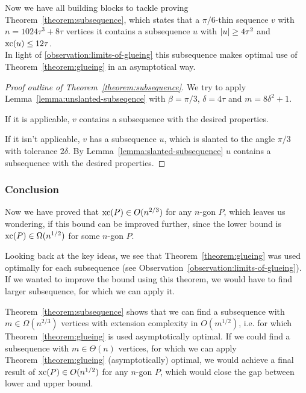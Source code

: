 Now we have all building blocks to tackle proving Theorem~\ref{theorem:subsequence}, which states that a $\pi/6$-thin sequence $v$ with $n = 1024\tau^3 + 8\tau$ vertices it contains a subsequence $u$ with $\lvert u\rvert \geq 4\tau^2$ and $\operatorname{xc}(u) \leq 12\tau$.\\
In light of \ref{observation:limits-of-glueing} this subsequence makes optimal use of Theorem~\ref{theorem:glueing} in an asymptotical way.

\begin{proof}[Proof outline of Theorem~\ref{theorem:subsequence}]
  We try to apply Lemma~\ref{lemma:unslanted-subseqence} with $\beta = \pi/3$, $\delta = 4\tau$ and $m = 8\delta^2 + 1$.

  If it is applicable, $v$ contains a subsequence with the desired properties.

  If it isn't applicable, $v$ has a subsequence $u$, which is slanted to the angle $\pi/3$ with tolerance $2\delta$. By Lemma~\ref{lemma:slanted-subsequence} $u$ contains a subsequence with the desired properties.
\end{proof}



\subsubsection{Conclusion}

Now we have proved that $\operatorname{xc}(P) \in O(n^{2/3})$ for any $n$-gon $P$, which leaves us wondering, if this bound can be improved further, since the lower bound is $\operatorname{xc}(P) \in \Omega(n^{1/2})$ for some $n$-gon $P$.

Looking back at the key ideas, we see that Theorem~\ref{theorem:glueing} was used optimally for each subsequence (see Observation~\ref{observation:limits-of-glueing}). If we wanted to improve the bound using this theorem, we would have to find larger subsequence, for which we can apply it.

Theorem~\ref{theorem:subsequence} shows that we can find a subsequence with $m \in \Omega(n^{2/3})$ vertices with extension complexity in $O(m^{1/2})$, i.e. for which Theorem~\ref{theorem:glueing} is used asymptotically optimal. If we could find a subsequence with $m \in \Theta(n)$ vertices, for which we can apply Theorem~\ref{theorem:glueing} (asymptotically) optimal, we would achieve a final result of $\operatorname{xc}(P) \in O(n^{1/2})$ for any $n$-gon $P$, which would close the gap between lower and upper bound.


